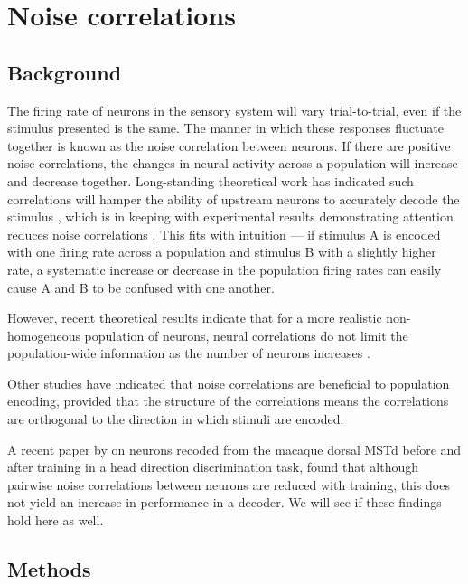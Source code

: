 \FloatBarrier
\section{Noise correlations}

\subsection{Background}

The firing rate of neurons in the sensory system will vary trial-to-trial, even if the stimulus presented is the same.
The manner in which these responses fluctuate together is known as the noise correlation between neurons.
If there are positive noise correlations, the changes in neural activity across a population will increase and decrease together.
Long-standing theoretical work has indicated such correlations will hamper the ability of upstream neurons to accurately decode the stimulus%
, which is in keeping with experimental results demonstrating attention reduces noise correlations \citep{Cohen2009}.
This fits with intuition --- if stimulus A is encoded with one firing rate across a population and stimulus B with a slightly higher rate, a systematic increase or decrease in the population firing rates can easily cause A and B to be confused with one another.

However, recent theoretical results indicate that for a more realistic non-homogeneous population of neurons, neural correlations do not limit the population-wide information as the number of neurons increases \citep{Oram1998,Averbeck2006,Ecker2011}.

Other studies have indicated that noise correlations are beneficial to population encoding, provided that the structure of the correlations means the correlations are orthogonal to the direction in which stimuli are encoded.

A recent paper by \citet{Gu2011} on neurons recoded from the macaque dorsal \ac{MSTd} before and after training in a head direction discrimination task, found that although pairwise noise correlations between neurons are reduced with training, this does not yield an increase in performance in a decoder.
We will see if these findings hold here as well.

\subsection{Methods}
\label{sec:dec-meth-noise}

